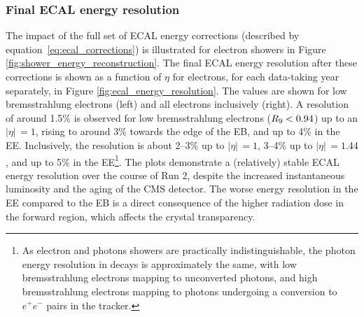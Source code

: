 \subsubsection{Final ECAL energy resolution}
The impact of the full set of ECAL energy corrections (described by equation~\ref{eq:ecal_corrections}) is illustrated for electron showers in Figure \ref{fig:shower_energy_reconstruction}. The final ECAL energy resolution after these corrections is shown as a function of $\eta$ for \Zee electrons, for each data-taking year separately, in Figure \ref{fig:ecal_energy_resolution}. The values are shown for low bremsstrahlung electrons (left) and all electrons inclusively (right). A resolution of around 1.5\% is observed for low bremsstrahlung electrons ($R_9<0.94$) up to an $|\eta|\,=1$, rising to around 3\% towards the edge of the EB, and up to 4\% in the EE. Inclusively, the resolution is about 2--3\% up to $|\eta|\,=1$, 3--4\% up to $|\eta|\,=1.44$, and up to 5\% in the EE\footnote{As electron and photons showers are practically indistinguishable, the photon energy resolution in \Hgg decays is approximately the same, with low bremsstrahlung electrons mapping to unconverted photons, and high bremsstrahlung electrons mapping to photons undergoing a conversion to $e^+e^-$ pairs in the tracker.}. The plots demonstrate a (relatively) stable ECAL energy resolution over the course of Run 2, despite the increased instantaneous luminosity and the aging of the CMS detector. The worse energy resolution in the EE compared to the EB is a direct consequence of the higher radiation dose in the forward region, which affects the crystal transparency.


